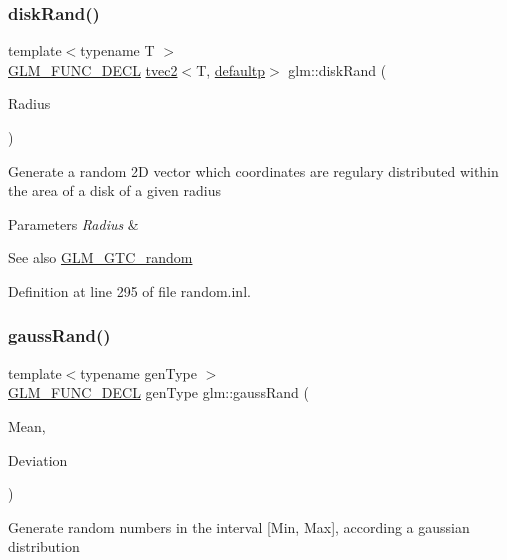 \subsubsection{\texorpdfstring{diskRand()}{diskRand()}}
{\footnotesize\ttfamily template$<$typename T $>$ \\
\mbox{\hyperlink{setup_8hpp_ab2d052de21a70539923e9bcbf6e83a51}{G\+L\+M\+\_\+\+F\+U\+N\+C\+\_\+\+D\+E\+CL}} \mbox{\hyperlink{structglm_1_1tvec2}{tvec2}}$<$T, \mbox{\hyperlink{namespaceglm_a0f04f086094c747d227af4425893f545a9d21ccd8b5a009ec7eb7677befc3bf51}{defaultp}}$>$ glm\+::disk\+Rand (\begin{DoxyParamCaption}\item[{T}]{Radius }\end{DoxyParamCaption})}

Generate a random 2D vector which coordinates are regulary distributed within the area of a disk of a given radius


\begin{DoxyParams}{Parameters}
{\em Radius} & \\
\hline
\end{DoxyParams}
\begin{DoxySeeAlso}{See also}
\mbox{\hyperlink{group__gtc__random}{G\+L\+M\+\_\+\+G\+T\+C\+\_\+random}} 
\end{DoxySeeAlso}


Definition at line 295 of file random.\+inl.

\mbox{\label{group__gtc__random_ga5193a83e49e4fdc5652c084711083574}} 
\subsubsection{\texorpdfstring{gaussRand()}{gaussRand()}}
{\footnotesize\ttfamily template$<$typename gen\+Type $>$ \\
\mbox{\hyperlink{setup_8hpp_ab2d052de21a70539923e9bcbf6e83a51}{G\+L\+M\+\_\+\+F\+U\+N\+C\+\_\+\+D\+E\+CL}} gen\+Type glm\+::gauss\+Rand (\begin{DoxyParamCaption}\item[{gen\+Type}]{Mean,  }\item[{gen\+Type}]{Deviation }\end{DoxyParamCaption})}

Generate random numbers in the interval \mbox{[}Min, Max\mbox{]}, according a gaussian distribution



